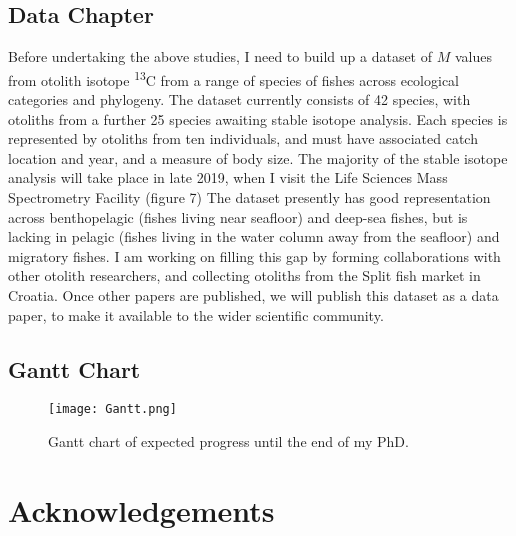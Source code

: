\documentclass[12pt, titlepage]{article}
\begin{document}
\subsection{Data Chapter}

Before undertaking the above studies, I need to build up a dataset of $M$ values from otolith isotope \textdelta \textsuperscript{13}C from a range of species of fishes across ecological categories and phylogeny.
The dataset currently consists of 42 species, with otoliths from a further 25 species awaiting stable isotope analysis.
Each species is represented by otoliths from ten individuals, and must have associated catch location and year, and a measure of body size.
The majority of the stable isotope analysis will take place in late 2019, when I visit the Life Sciences Mass Spectrometry Facility (figure 7) %
The dataset presently has good representation across benthopelagic (fishes living near seafloor) and deep-sea fishes, but is lacking in pelagic (fishes living in the water column away from the seafloor) and migratory fishes.
I am working on filling this gap by forming collaborations with other otolith researchers, and collecting otoliths from the Split fish market in Croatia.
Once other papers are published, we will publish this dataset as a data paper, to make it available to the wider scientific community.

\pagebreak
\begin{landscape}
\subsection{Gantt Chart}

\begin{figure}[H]
\texttt{[image: Gantt.png]}
\caption{Gantt chart of expected progress until the end of my PhD.}
\end{figure}

\end{landscape}

\pagebreak
\section{Acknowledgements}
\end{document}
